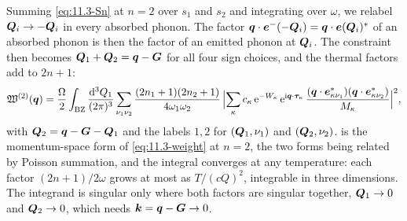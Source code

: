 Summing \cref{eq:11.3-Sn} at $n = 2$ over $s_1$ and $s_2$ and integrating over $\omega$, we relabel $\bm{Q}_i \to -\bm{Q}_i$ in every absorbed phonon. The factor $\bm{q}\cdot\bm{e}^{-}(-\bm{Q}_i) = \bm{q}\cdot\bm{e}(\bm{Q}_i)^*$ of an absorbed phonon is then the factor of an emitted phonon at $\bm{Q}_i$. The constraint then becomes $\bm{Q}_1 + \bm{Q}_2 = \bm{q} - \bm{G}$ for all four sign choices, and the thermal factors add to $2n + 1$:
\begin{equation}
  \mathfrak{W}^{(2)}(\bm{q}) = \frac{\Omega}{2}\int_{\mathrm{BZ}}\frac{\mathrm{d}^3Q_1}{(2\pi)^3}\sum_{\nu_1\nu_2}\frac{(2n_1 + 1)(2n_2 + 1)}{4\omega_1\omega_2}\,\Bigl|\sum_\kappa c_\kappa\,\mathrm{e}^{-W_\kappa}\,\mathrm{e}^{\mathrm{i}\bm{q}\cdot\bm{\tau}_\kappa}\,\frac{(\bm{q}\cdot\bm{e}^*_{\kappa\nu_1})(\bm{q}\cdot\bm{e}^*_{\kappa\nu_2})}{M_\kappa}\Bigr|^2 ,
  \label{eq:D.31-W2}
\end{equation}
with $\bm{Q}_2 = \bm{q} - \bm{G} - \bm{Q}_1$ and the labels $1, 2$ for $(\bm{Q}_1,\nu_1)$ and $(\bm{Q}_2,\nu_2)$.  is the momentum-space form of \cref{eq:11.3-weight} at $n = 2$, the two forms being related by Poisson summation, and the integral converges at any temperature: each factor $(2n + 1)/2\omega$ grows at most as $T/(cQ)^2$, integrable in three dimensions. The integrand is singular only where both factors are singular together, $\bm{Q}_1 \to 0$ and $\bm{Q}_2 \to 0$, which needs $\bm{k} = \bm{q} - \bm{G} \to 0$.

